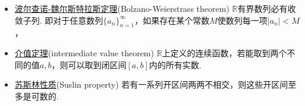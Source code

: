 \documentclass[main.tex]{subfiles}
\begin{document}
\begin{itemize}
    \item \uline{波尔查诺-魏尔斯特拉斯定理}(Bolzano-Weierstrass theorem) \newline
    \(\mathbb{R}\)有界数列必有收敛子列. 即对于任意数列\(\{a_n\}_{n=1}^{\infty}\)，如果存在某个常数\(M\)使数列每一项\(|a_n|<M\)，

    \item \uline{介值定理}(intermediate value theorem) \newline
    \(\mathbb{R}\)上定义的连续函数，若能取到两个不同的值\(a,b\)，则可以取到闭区间\([a,b]\)内的所有实数.

    \item \uline{苏斯林性质}(Suslin property) \newline
    若有一系列开区间两两不相交，则这些开区间至多是可数的.

\end{itemize}



\end{document}
